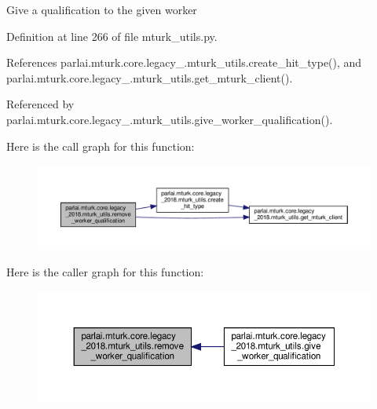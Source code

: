 \begin{DoxyVerb}Give a qualification to the given worker\end{DoxyVerb}
 

Definition at line 266 of file mturk\+\_\+utils.\+py.



References parlai.\+mturk.\+core.\+legacy\+\_.\+mturk\+\_\+utils.\+create\+\_\+hit\+\_\+type(), and parlai.\+mturk.\+core.\+legacy\+\_.\+mturk\+\_\+utils.\+get\+\_\+mturk\+\_\+client().



Referenced by parlai.\+mturk.\+core.\+legacy\+\_.\+mturk\+\_\+utils.\+give\+\_\+worker\+\_\+qualification().

Here is the call graph for this function\+:
\nopagebreak
\begin{figure}[H]
\begin{center}
\leavevmode
\includegraphics[width=350pt]{namespaceparlai_1_1mturk_1_1core_1_1legacy__2018_1_1mturk__utils_aeb2a9fb74d8d0bbfe744bb6d89bee910_cgraph}
\end{center}
\end{figure}
Here is the caller graph for this function\+:
\nopagebreak
\begin{figure}[H]
\begin{center}
\leavevmode
\includegraphics[width=350pt]{namespaceparlai_1_1mturk_1_1core_1_1legacy__2018_1_1mturk__utils_aeb2a9fb74d8d0bbfe744bb6d89bee910_icgraph}
\end{center}
\end{figure}
\mbox{\label{namespaceparlai_1_1mturk_1_1core_1_1legacy__2018_1_1mturk__utils_a6567af08013cf893310b91b3e1a946e5}} 
